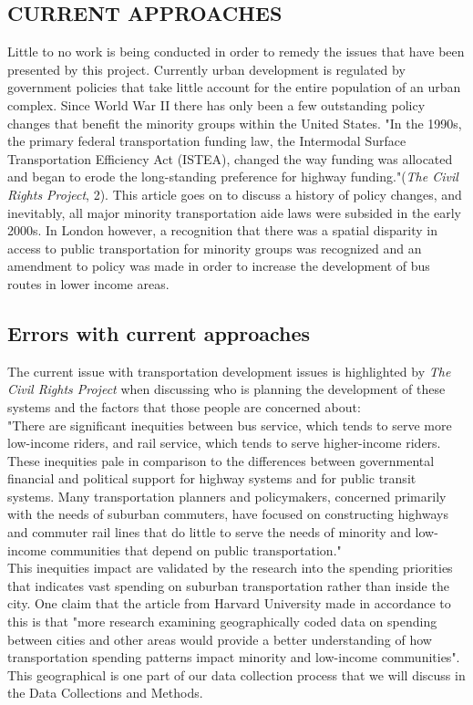\documentclass[12pt]{article}
\begin{document}
\begin{multicols}{2}
\section{CURRENT APPROACHES}
Little to no work is being conducted in order to remedy the issues that have been presented by this project. Currently urban development is regulated by government policies that take little account for the entire population of an urban complex. Since World War II there has only been a few outstanding policy changes that benefit the minority groups within the United States. "In the 1990s, the primary federal transportation funding law, the Intermodal Surface Transportation Efficiency Act (ISTEA), changed the way funding was allocated and began to erode the long-standing preference for highway funding."(\textit{The Civil Rights Project}, 2). This article goes on to discuss a history of policy changes, and inevitably, all major minority transportation aide laws were subsided in the early 2000s. In London however, a recognition that there was a spatial disparity in access to public transportation for minority groups was recognized and an amendment to policy was made in order to increase the development of bus routes in lower income areas.
\subsection{Errors with current approaches}
The current issue with transportation development issues is highlighted by \textit{The Civil Rights Project} when discussing who is planning the development of these systems and the factors that those people are concerned about:\\
"There are significant inequities between bus service, which tends to serve more low-income riders, and rail service, which tends to serve higher-income riders. These inequities pale in comparison to the differences between governmental financial and political support for highway systems and for public transit systems. Many transportation planners and policymakers, concerned primarily with the needs of suburban commuters, have focused on constructing highways and commuter rail lines that do little to serve the needs of minority and low-income communities that depend on public transportation."\\
This inequities impact are validated by the research into the spending priorities that indicates vast spending on suburban transportation rather than inside the city. One claim that the article from Harvard University made in accordance to this is that "more research examining geographically coded data on spending between cities and other areas would provide a better understanding of how transportation spending patterns impact minority and low-income communities". This geographical is one part of our data collection process that we will discuss in the Data Collections and Methods.


\end{multicols}
\end{document}
